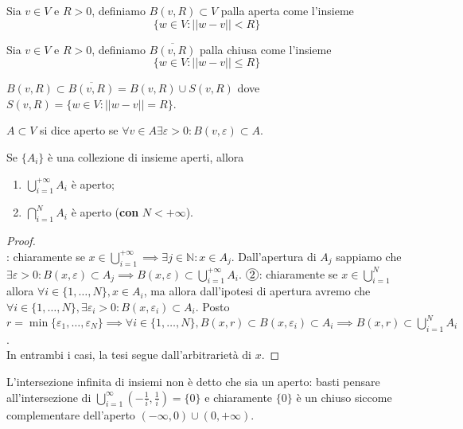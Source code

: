 \documentclass[12pt, twoside, italian, openany]{book}
\begin{document}
	\begin{definition}
		Sia $v \in V$ e $R > 0$, definiamo $B(v, R) \subset V$ palla aperta come l'insieme
		$$
		\{ w \in V: ||w-v|| < R \}
		$$
	\end{definition}
	\begin{definition}
		Sia $v \in V$ e $R > 0$, definiamo $\overline{B(v, R)}$ palla chiusa come l'insieme
		$$
		\{ w \in V: ||w-v|| \leq R \}
		$$
	\end{definition}
	\begin{remark}
		$B(v, R) \subset \overline{B(v, R)} = B(v, R) \cup S(v, R)$ dove $S(v, R) = \{ w \in V: ||w-v|| = R \}$.
	\end{remark}
	\begin{definition}
		$A \subset V$ si dice aperto se $\forall v \in A \exists \varepsilon > 0: B(v, \varepsilon) \subset A$.
	\end{definition}
	\begin{prop}
		Se $\{ A_i \}$ è una collezione di insieme aperti, allora
		\begin{enumerate}[label=\protect\circled{\arabic*}]
			\item $\bigcup\limits_{i=1}^{+\infty} A_i$ è aperto;
			\item $\bigcap\limits_{i=1}^N A_i$ è aperto (\textbf{con} $N < + \infty$).
		\end{enumerate}
	\end{prop}
	\begin{proof} \hspace{1cm} \\
		: chiaramente se $x \in \bigcup\limits_{i=1}^{+\infty} \implies \exists j \in \mathbb{N}: x \in A_j$. Dall'apertura di $A_j$ sappiamo che $\exists \varepsilon > 0: B(x, \varepsilon) \subset A_j \implies B(x, \varepsilon) \subset \bigcup\limits_{i=1}^{+\infty} A_i$. $\circled{2}$: chiaramente se $x \in \bigcup\limits_{i=1}^N$ allora $\forall i \in \{ 1, \ldots, N \}, x \in A_i$, ma allora
		dall'ipotesi di apertura avremo che $\forall i \in \{ 1, \ldots, N \}, \exists \varepsilon_i > 0: B(x, \varepsilon_i) \subset A_i$. Posto $r = \min\{ \varepsilon_1, \ldots, \varepsilon_N \} \implies \forall i \in \{1, \ldots, N \}, B(x, r) \subset B(x, \varepsilon_i) \subset A_i \implies B(x, r) \subset \bigcup\limits_{i=1}^N A_i$. \\
		In entrambi i casi, la tesi segue dall'arbitrarietà di $x$. 
	\end{proof}
	\begin{remark}
		L'intersezione infinita di insiemi non è detto che sia un aperto: basti pensare all'intersezione di $\bigcup\limits_{i=1}^{\infty} (-\frac{1}{i}, \frac{1}{i}) = \{ 0 \}$ e chiaramente $\{ 0 \}$ è un chiuso siccome complementare dell'aperto $(-\infty, 0) \cup (0, +\infty)$.
	\end{remark}
\end{document}
